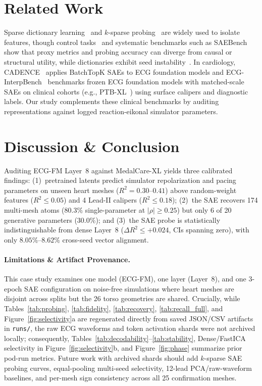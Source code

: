 \documentclass[10pt,twocolumn,letterpaper]{article}
\begin{document}
\section{Related Work}
Sparse dictionary learning~\cite{bricken2023towards,cunningham2023sparse,bussmann2024batchtopk,rajamanoharan2024jumprelu} and $k$-sparse probing~\cite{gurnee2023finding} are widely used to isolate features, though control tasks~\cite{hewitt2019designing} and systematic benchmarks such as SAEBench~\cite{karvonen2025saebench} show that proxy metrics and probing accuracy can diverge from causal or structural utility, while dictionaries exhibit seed instability~\cite{paulo2025sparse,heap2025saes}. In cardiology, CADENCE~\cite{duan2026cadence} applies BatchTopK SAEs to ECG foundation models and ECG-InterpBench~\cite{duan2026ecginterpbench} benchmarks frozen ECG foundation models with matched-scale SAEs on clinical cohorts (e.g., PTB-XL~\cite{wagner2020ptbxl}) using surface calipers and diagnostic labels. Our study complements these clinical benchmarks by auditing representations against logged reaction-eikonal simulator parameters.

\section{Discussion \& Conclusion}
Auditing ECG-FM Layer~8 against MedalCare-XL yields three calibrated findings: (1)~pretrained latents predict simulator repolarization and pacing parameters on unseen heart meshes ($R^2 = 0.30\text{--}0.41$) above random-weight features ($R^2 \le 0.05$) and 4 Lead-II calipers ($R^2 \le 0.18$); (2)~the SAE recovers 174 multi-mesh atoms ($80.3\%$ single-parameter at $|\rho| \ge 0.25$) but only 6 of 20 generative parameters (30.0\%); and (3)~the SAE probe is statistically indistinguishable from dense Layer~8 ($\Delta R^2 \le +0.024$, CIs spanning zero), with only $8.05\%\text{--}8.62\%$ cross-seed vector alignment.

\paragraph{Limitations \& Artifact Provenance.}
This case study examines one model (ECG-FM), one layer (Layer~8), and one 3-epoch SAE configuration on noise-free simulations where heart meshes are disjoint across splits but the 26 torso geometries are shared. Crucially, while Tables~\ref{tab:probing}, \ref{tab:fidelity}, \ref{tab:recovery}, \ref{tab:recall_full}, and Figure~\ref{fig:selectivity}a are regenerated directly from saved JSON/CSV artifacts in \texttt{runs/}, the raw ECG waveforms and token activation shards were not archived locally; consequently, Tables~\ref{tab:decodability}--\ref{tab:stability}, Dense/FastICA selectivity in Figure~\ref{fig:selectivity}b, and Figure~\ref{fig:phase} summarize prior pod-run metrics. Future work with archived shards should add $k$-sparse SAE probing curves, equal-pooling multi-seed selectivity, 12-lead PCA/raw-waveform baselines, and per-mesh sign consistency across all 25 confirmation meshes.
\end{document}
